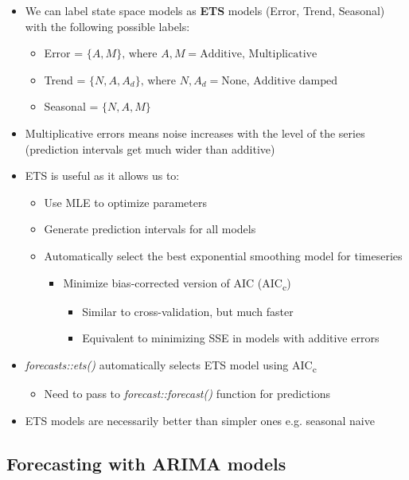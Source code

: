 \documentclass{article}\usepackage[]{graphicx}\usepackage[]{color}
\begin{document}
\begin{itemize}
    \item We can label state space models as \textbf{ETS} models (Error, Trend, Seasonal) with the following possible labels:
    \begin{itemize}
        \item Error = $\{A, M\}\text{, where } A,M = \text{Additive, Multiplicative}$
        \item Trend = $\{N, A, A_d\} \text{, where } N, A_d = \text{None, Additive damped}$
        \item Seasonal = $\{N, A, M\}$
    \end{itemize}
    \item Multiplicative errors means noise increases with the level of the series (prediction intervals get much wider than additive)
    \item ETS is useful as it allows us to:
    \begin{itemize}
        \item Use MLE to optimize parameters
        \item Generate prediction intervals for all models
        \item Automatically select the best exponential smoothing model for timeseries
        \begin{itemize}
            \item Minimize bias-corrected version of AIC (AIC\textsubscript{c})
            \begin{itemize}
                \item Similar to cross-validation, but much faster
                \item Equivalent to minimizing SSE in models with additive errors
            \end{itemize}
        \end{itemize}
    \end{itemize}
    \item \textit{forecasts::ets()} automatically selects ETS model using AIC\textsubscript{c}
    \begin{itemize}
        \item Need to pass to \textit{forecast::forecast()} function for predictions
    \end{itemize}
    \item ETS models are necessarily better than simpler ones e.g. seasonal naive
\end{itemize}

\subsection{Forecasting with ARIMA models}
\end{document}
